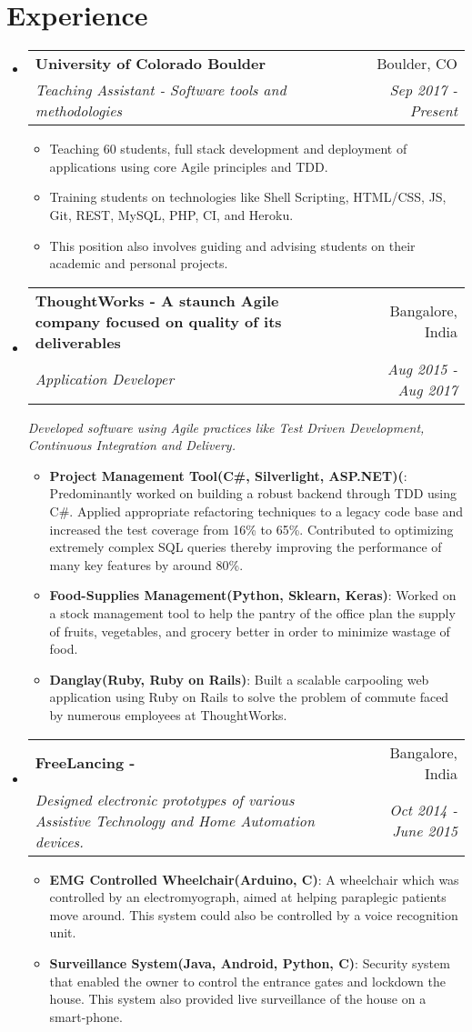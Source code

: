 \documentclass[letterpaper,11pt]{article}
\makeatletter
\newcommand{\resumeItem}[2]{
  \item\small{
    \textbf{#1}{: #2 \vspace{-2pt}}
  }
}
\newcommand{\resumePoint}[1]{
  \item\small{#1}
}
\newcommand{\resumeSubheading}[4]{
  \vspace{-1pt}\item
    \begin{tabular*}{0.97\textwidth}{l@{\extracolsep{\fill}}r}
      \textbf{#1} & #2 \\
      \textit{\small#3} & \textit{\small #4} \\
    \end{tabular*}\vspace{-2pt}
}
\newcommand{\resumeSubheadingWithDescription}[5]{
  \vspace{-1pt}\item
    \begin{tabular*}{0.97\textwidth}{l@{\extracolsep{\fill}}r}
      \textbf{#1} & #2 \\
      \textit{\small#3} & \textit{\small #4} \\
    \end{tabular*}\vspace{2pt}
    \textit{\small#5}\vspace{0pt}
}
\newcommand{\resumeSubHeadingListStart}{\begin{itemize}[leftmargin=*]}
\newcommand{\resumeSubHeadingListEnd}{\end{itemize}\vspace{-10pt}}
\newcommand{\resumeItemListStart}{\begin{itemize}\vspace{-4pt}}
\newcommand{\resumeItemListEnd}{\end{itemize}\vspace{-5pt}}
\makeatother
\begin{document}

\section{Experience}
  \resumeSubHeadingListStart
    \resumeSubheading
      {University of Colorado Boulder}{Boulder, CO}
      {Teaching Assistant - Software tools and methodologies}{Sep 2017 - Present}
      \resumeItemListStart
          \resumePoint{Teaching 60 students, full stack development and deployment of applications using core Agile principles and TDD.
          }
          \resumePoint{Training students on technologies like Shell Scripting, HTML/CSS, JS, Git, REST, MySQL, PHP, CI, and Heroku.
          }
          \resumePoint{This position also involves guiding and advising students on their academic and personal projects.
          }
      \resumeItemListEnd
    \resumeSubheadingWithDescription
      {ThoughtWorks - \normalfont A staunch Agile company focused on quality of its deliverables}{Bangalore, India}
      {Application Developer}{Aug 2015 - Aug 2017}
      {Developed software using Agile practices like Test Driven Development, Continuous Integration and Delivery.}
      \resumeItemListStart
      \resumeItem{Project Management Tool(C\#, Silverlight, ASP.NET)(\normalfont{for the largest consulting firm in the world)}}
      {Predominantly worked on building a robust backend through TDD using C\#. Applied appropriate refactoring techniques to a legacy code base and increased the test coverage from 16\% to 65\%. Contributed to optimizing extremely complex SQL queries thereby improving the performance of many key features by around 80\%.}
      \resumeItem{Food-Supplies Management(Python, Sklearn, Keras)}{Worked on a stock management tool to help the pantry of the office plan the supply of fruits, vegetables, and grocery better in order to minimize wastage of food.}
      \resumeItem{Danglay(Ruby, Ruby on Rails)}{Built a scalable carpooling web application using Ruby on Rails to solve the problem of commute faced by numerous employees at ThoughtWorks.}
      \resumeItemListEnd
    \resumeSubheading
      {FreeLancing - \normalfont{Embedded System Prototyping}}{Bangalore, India}
      {Designed electronic prototypes of various Assistive Technology and Home Automation devices.}{Oct 2014 - June 2015}
      \resumeItemListStart
          \resumeItem{EMG Controlled Wheelchair(Arduino, C)}{A wheelchair which was controlled by an electromyograph, aimed at helping paraplegic patients move around. This system could also be controlled by a voice recognition unit.}
          \resumeItem{Surveillance System(Java, Android, Python, C)}{Security system that enabled the owner to control the entrance gates and lockdown the house. This system also provided live surveillance of the house on a smart-phone.}
      \resumeItemListEnd
  \resumeSubHeadingListEnd
\end{document}
